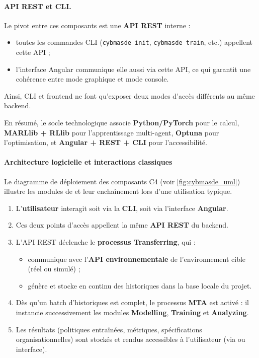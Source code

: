 \paragraph{API REST et CLI.}
Le pivot entre ces composants est une \textbf{API REST} interne :
\begin{itemize}
  \item toutes les commandes CLI (\texttt{cybmasde init}, \texttt{cybmasde train}, etc.) appellent cette API ;
  \item l'interface Angular communique elle aussi via cette API, ce qui garantit une cohérence entre mode graphique et mode console.
\end{itemize}
Ainsi, CLI et frontend ne font qu'exposer deux modes d'accès différents au même backend.

\medskip
\noindent
En résumé, le socle technologique associe \textbf{Python/PyTorch} pour le calcul, \textbf{MARLlib + RLlib} pour l'apprentissage multi-agent, \textbf{Optuna} pour l'optimisation, et \textbf{Angular + REST + CLI} pour l'accessibilité.

\paragraph{Architecture logicielle et interactions classiques}

Le diagramme de déploiement des composants C4 (voir \autoref{fig:cybmasde_uml}) illustre les modules de  et leur enchaînement lors d'une utilisation typique.

\begin{enumerate}
  \item L'\textbf{utilisateur} interagit soit via la \textbf{CLI}, soit via l'interface \textbf{Angular}.
  \item Ces deux points d'accès appellent la même \textbf{API REST} du backend.
  \item L'API REST déclenche le \textbf{processus Transferring}, qui :
        \begin{itemize}
          \item communique avec l'\textbf{API environnementale} de l'environnement cible (réel ou simulé) ;
          \item génère et stocke en continu des historiques dans la base locale du projet.
        \end{itemize}
  \item Dès qu'un batch d'historiques est complet, le processus \textbf{MTA} est activé : il instancie successivement les modules \textbf{Modelling}, \textbf{Training} et \textbf{Analyzing}.
  \item Les résultats (politiques entraînées, métriques, spécifications organisationnelles) sont stockés et rendus accessibles à l'utilisateur (via  ou interface).
\end{enumerate}

